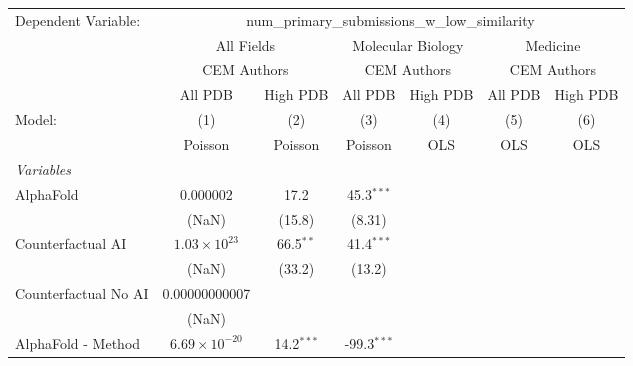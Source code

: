 \begingroup
\centering
\begin{tabular}{lcccccc}
   \tabularnewline \midrule \midrule
   Dependent Variable: & \multicolumn{6}{c}{num\_primary\_submissions\_w\_low\_similarity}\\
 & \multicolumn{2}{c}{All Fields} & \multicolumn{2}{c}{Molecular Biology} & \multicolumn{2}{c}{Medicine} \\
\cmidrule(lr){2-3} \cmidrule(lr){4-5} \cmidrule(lr){6-7}
 & \multicolumn{2}{c}{CEM Authors} & \multicolumn{2}{c}{CEM Authors} & \multicolumn{2}{c}{CEM Authors} \\
\cmidrule(lr){2-3} \cmidrule(lr){4-5} \cmidrule(lr){6-7}
 & \multicolumn{1}{c}{All PDB} & \multicolumn{1}{c}{High PDB} & \multicolumn{1}{c}{All PDB} & \multicolumn{1}{c}{High PDB} & \multicolumn{1}{c}{All PDB} & \multicolumn{1}{c}{High PDB} \\
\cmidrule(lr){2-2} \cmidrule(lr){3-3} \cmidrule(lr){4-4} \cmidrule(lr){5-5} \cmidrule(lr){6-6} \cmidrule(lr){7-7}
   Model:                                                  & (1)                     & (2)          & (3)           & (4)  & (5)  & (6)\\  
                                                           &  Poisson                & Poisson      & Poisson       & OLS  & OLS  & OLS\\  
   \midrule
   \emph{Variables}\\
   AlphaFold                                               & 0.000002                & 17.2         & 45.3$^{***}$  &      &      &   \\   
                                                           & (NaN)                   & (15.8)       & (8.31)        &      &      &   \\   
   Counterfactual AI                                       & $1.03\times 10^{23}$    & 66.5$^{**}$  & 41.4$^{***}$  &      &      &   \\   
                                                           & (NaN)                   & (33.2)       & (13.2)        &      &      &   \\   
   Counterfactual No AI                                    & 0.00000000007           &              &               &      &      &   \\   
                                                           & (NaN)                   &              &               &      &      &   \\   
   AlphaFold - Method                                      & $6.69\times 10^{-20}$   & 14.2$^{***}$ & -99.3$^{***}$ &      &      &   \\   

\end{tabular}
